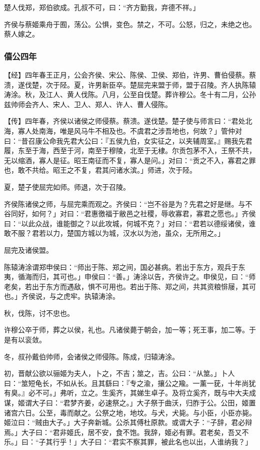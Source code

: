 \documentclass[]{article}
\begin{document}
楚人伐郑，郑伯欲成。孔叔不可，曰：``齐方勤我，弃德不祥。」

齐侯与蔡姬乘舟于囿，荡公。公惧，变色。禁之，不可。公怒，归之，未绝之也。蔡人嫁之。

\hypertarget{header-n678}{%
\subsubsection{僖公四年}\label{header-n678}}

【经】四年春王正月，公会齐侯、宋公、陈侯、卫侯、郑伯，许男、曹伯侵蔡。蔡溃，遂伐楚，次于陉。夏，许男新臣卒。楚屈完来盟于师，盟于召陵。齐人执陈辕涛涂。秋，及江人、黄人伐陈。八月，公至自伐楚。葬许穆公。冬十有二月，公孙兹帅师会齐人、宋人、卫人、郑人、许人、曹人侵陈。

【传】四年春，齐侯以诸侯之师侵蔡。蔡溃。遂伐楚。楚子使与师言曰：``君处北海，寡人处南海，唯是风马牛不相及也。不虞君之涉吾地也，何故？」管仲对曰：``昔召康公命我先君大公曰：『五侯九伯，女实征之，以夹辅周室。』赐我先君履，东至于海，西至于河，南至于穆陵，北至于无棣。尔贡包茅不入，王祭不共，无以缩酒，寡人是征。昭王南征而不复，寡人是问。」对曰：``贡之不入，寡君之罪也，敢不共给。昭王之不复，君其问诸水滨。」师进，次于陉。

夏，楚子使屈完如师。师退，次于召陵。

齐侯陈诸侯之师，与屈完乘而观之。齐侯曰：``岂不谷是为？先君之好是继。与不谷同好，如何？」对曰：``君惠徼福于敝邑之社稷，辱收寡君，寡君之愿也。」齐侯曰：``以此众战，谁能御之？以此攻城，何城不克？」对曰：``君若以德绥诸侯，谁敢不服？君若以力，楚国方城以为城，汉水以为池，虽众，无所用之。」

屈完及诸侯盟。

陈辕涛涂谓郑申侯曰：``师出于陈、郑之间，国必甚病。若出于东方，观兵于东夷，循海而归，其可也。」申侯曰：``善。」涛涂以告，齐侯许之。申侯见，曰：``师老矣，若出于东方而遇敌，惧不可用也。若出于陈、郑之间，共其资粮悱屦，其可也。」齐侯说，与之虎牢。执辕涛涂。

秋，伐陈，讨不忠也。

许穆公卒于师，葬之以侯，礼也。凡诸侯薨于朝会，加一等；死王事，加二等。于是有以衮敛。

冬，叔孙戴伯帅师，会诸侯之师侵陈。陈成，归辕涛涂。

初，晋献公欲以骊姬为夫人，卜之，不吉；筮之，吉。公曰：``从筮。」卜人曰：``筮短龟长，不如从长。且其繇曰：『专之渝，攘公之羭。一薰一莸，十年尚犹有臭。』必不可。」弗听，立之。生奚齐，其娣生卓子。及将立奚齐，既与中大夫成谋，姬谓大子曰：``君梦齐姜，必速祭之。」大子祭于曲沃，归胙于公。公田，姬置诸宫六日。公至，毒而献之。公祭之地，地坟。与犬，犬毙。与小臣，小臣亦毙。姬泣曰：``贼由大子。」大子奔新城。公杀其傅杜原款。或谓大子：``子辞，君必辩焉。」大子曰：``君非姬氏，居不安，食不饱。我辞，姬必有罪。君老矣，吾又不乐。」曰：``子其行乎！」大子曰：``君实不察其罪，被此名也以出，人谁纳我？」
\end{document}
